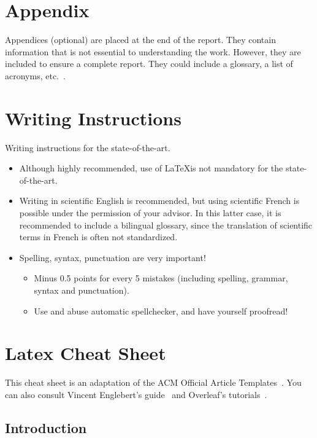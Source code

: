 \section{Appendix}

Appendices (optional) are placed at the end of the report. They contain information that is not essential to understanding the work. However, they are included to ensure a complete report. They could include a glossary, a list of acronyms, etc.~\cite{melot2008elements}.

\section{Writing Instructions}

Writing instructions for the state-of-the-art.

\begin{itemize}
    \item Although highly recommended, use of \LaTeX is not mandatory for the state-of-the-art.
    \item Writing in scientific English is recommended, but using scientific French is possible under the permission of your advisor. In this latter case, it is recommended to include a bilingual glossary, since the translation of scientific terms in French is often not standardized.  
    \item Spelling, syntax, punctuation are very important! 
    \begin{itemize}
        \item Minus 0.5 points for every 5 mistakes (including spelling, grammar, syntax and punctuation).
        \item Use and abuse automatic spellchecker, and have yourself proofread!
    \end{itemize}
\end{itemize}

\section{Latex Cheat Sheet}

This cheat sheet is an adaptation of the ACM Official Article Templates~\cite{acm2023templates}. You can also consult Vincent Englebert's guide~\cite{englebert2023latex} and Overleaf's tutorials~\cite{overleaf2023latex}.

\subsection{Introduction}

